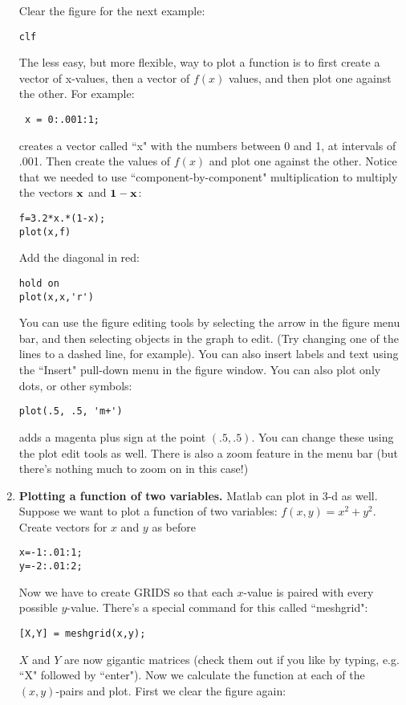 \documentclass[12pt]{report}
\begin{document}
\begin{enumerate}
Clear the figure for the next example:
\begin{verbatim}
clf
\end{verbatim}
The less easy, but more flexible, way to plot a function is to first create a vector of x-values, then a vector of $f(x)$ values, and then plot one against the other.  For example:
\begin{verbatim}
 x = 0:.001:1;
\end{verbatim}
creates a vector called ``x" with the numbers between 0 and 1, at intervals of .001.  Then create the values of $f(x)$ and plot one against the other.  Notice that we needed to use ``component-by-component" multiplication to multiply the vectors ${\bf x}$ and ${\bf 1 - x}$:
\begin{verbatim}
f=3.2*x.*(1-x);
plot(x,f)
\end{verbatim}
Add the diagonal in red:
\begin{verbatim}
hold on
plot(x,x,'r')
\end{verbatim}
You can use the figure editing tools by selecting the arrow in the figure menu bar, and then selecting objects in the graph to edit.  (Try changing one of the lines to a dashed line, for example).  You can also insert labels and text using the ``Insert" pull-down menu in the figure window.  You can also plot only dots, or other symbols:
\begin{verbatim}
plot(.5, .5, 'm+')
\end{verbatim}
adds a magenta plus sign at the point $(.5, .5)$.  You can change these using the plot edit tools as well.  There is also a zoom feature in the menu bar (but there's nothing much to zoom on in this case!)
\item	{\bf Plotting a function of two variables.}
Matlab can plot in 3-d as well.  Suppose we want to plot a function of two variables:
$f(x,y) = x^2 + y^2$.  Create vectors for $x$ and $y$ as before
\begin{verbatim}
x=-1:.01:1;
y=-2:.01:2;
\end{verbatim}
Now we have to create GRIDS so that each $x$-value is paired with every possible $y$-value. There's a special command for this
called ``meshgrid":
\begin{verbatim}
[X,Y] = meshgrid(x,y);
\end{verbatim}
$X$ and $Y$ are now gigantic matrices (check them out if you like by typing, e.g. ``X" followed by ``enter").  Now we calculate
the function at each of the $(x,y)$-pairs and plot.  First we clear the figure again:
\begin{verbatim}

\end{verbatim}
\end{enumerate}
\end{document}
